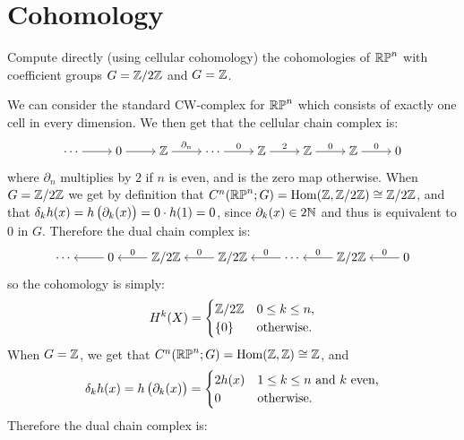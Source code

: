 \documentclass[11pt,a4paper]{article}
\begin{document}
\section{Cohomology}
\begin{exercise}
 Compute directly (using cellular cohomology) the cohomologies of $\mathbb{RP}^n$
 with coefficient groups $G = \mathbb{Z}/2\mathbb{Z}$ and $G = \mathbb{Z}$.
\end{exercise}
\begin{solution}
  We can consider the standard CW-complex for $\mathbb{RP}^n$ which consists
  of exactly one cell in every dimension.
  We then get that the cellular chain complex is:
  \[\begin{tikzcd}[ampersand replacement=\&,cramped]
    \cdots \& 0 \& \Z \& \cdots \& \Z \& \Z \& \Z \& 0
    \arrow[from=1-1, to=1-2]
    \arrow[from=1-2, to=1-3]
    \arrow["{\partial_n}", from=1-3, to=1-4]
    \arrow["0", from=1-4, to=1-5]
    \arrow["2", from=1-5, to=1-6]
    \arrow["0", from=1-6, to=1-7]
    \arrow["0", from=1-7, to=1-8]
  \end{tikzcd}\]
  where $\partial_n$ multiplies by $2$ if $n$ is even,
  and is the zero map otherwise.
  When $G = \mathbb{Z}/2\mathbb{Z}$ we get by definition
  that $C^n(\mathbb{RP}^n;G) = \operatorname{Hom}(\mathbb{Z},\mathbb{Z}/2\mathbb{Z}) \cong \mathbb{Z}/2\mathbb{Z}$,
  and that $\delta_k h(x) = h\del{\partial_k(x)} = 0 \cdot h(1) = 0$,
  since $\partial_k(x) \in 2\mathbb{N}$ and thus is equivalent to $0$ in $G$.
  Therefore the dual chain complex is:
  \[\begin{tikzcd}[ampersand replacement=\&,cramped]
    \cdots \& 0 \& {\Z/2\Z} \& {\Z/2\Z} \& \cdots \& {\Z/2\Z} \& 0
    \arrow[from=1-2, to=1-1]
    \arrow["0"', from=1-3, to=1-2]
    \arrow["0"', from=1-4, to=1-3]
    \arrow["0"', from=1-5, to=1-4]
    \arrow["0"', from=1-6, to=1-5]
    \arrow["0"', from=1-7, to=1-6]
  \end{tikzcd}\]
  so the cohomology is simply:
  \[
    H^k(X) =
    \begin{cases}
      \mathbb{Z}/2\mathbb{Z} &0 \le k \le n, \\
      \left\{0\right\} &\text{otherwise}.
    \end{cases}
  \]
  When $G = \mathbb{Z}$, we get that $C^n(\mathbb{RP}^n;G) = \operatorname{Hom}(\mathbb{Z},\mathbb{Z}) \cong \mathbb{Z}$,
  and
  \[
    \delta_k h(x) = h\del{\partial_k(x)} =
    \begin{cases}
      2 h(x) & 1 \le k \le n \stand k \text{ even}, \\
      0 &\text{otherwise}.
    \end{cases}
  \]
  Therefore the dual chain complex is: 
  \[\begin{tikzcd}[ampersand replacement=\&,cramped]

\end{tikzcd}\]
\end{solution}
\end{document}
